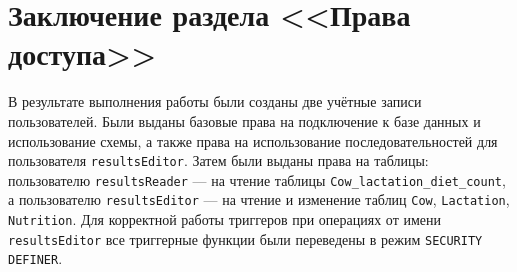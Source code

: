 

\section*{Заключение раздела <<Права доступа>>}

В результате выполнения работы были созданы две учётные записи пользователей.
Были выданы базовые права на подключение к базе данных и использование схемы,
а также права на использование последовательностей для пользователя \texttt{resultsEditor}.
Затем были выданы права на таблицы: пользователю \texttt{resultsReader} ---
на чтение таблицы \texttt{Cow\_lactation\_diet\_count},
а пользователю \texttt{resultsEditor} --- на чтение и изменение таблиц
\texttt{Cow}, \texttt{Lactation}, \texttt{Nutrition}.
Для корректной работы триггеров при операциях от имени \texttt{resultsEditor}
все триггерные функции были переведены в режим \texttt{SECURITY DEFINER}.
